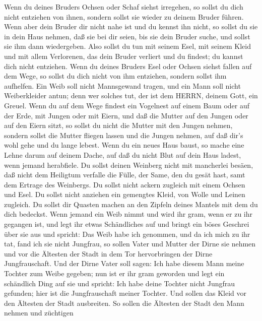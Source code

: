  Wenn du deines Bruders Ochsen oder Schaf siehst irregehen,
so sollst du dich nicht entziehen von ihnen, sondern sollst sie wieder
zu deinem Bruder führen.  Wenn aber dein Bruder dir nicht
nahe ist und du kennst ihn nicht, so sollst du sie in dein Haus nehmen,
daß sie bei dir seien, bis sie dein Bruder suche, und sollst sie ihm
dann wiedergeben.  Also sollst du tun mit seinem Esel, mit
seinem Kleid und mit allem Verlorenen, das dein Bruder verliert und du
findest; du kannst dich nicht entziehen.  Wenn du deines
Bruders Esel oder Ochsen siehst fallen auf dem Wege, so sollst du dich
nicht von ihm entziehen, sondern sollst ihm aufhelfen.  Ein
Weib soll nicht Mannsgewand tragen, und ein Mann soll nicht
Weiberkleider antun; denn wer solches tut, der ist dem HERRN, deinem
Gott, ein Greuel.  Wenn du auf dem Wege findest ein
Vogelnest auf einem Baum oder auf der Erde, mit Jungen oder mit Eiern,
und daß die Mutter auf den Jungen oder auf den Eiern sitzt, so sollst du
nicht die Mutter mit den Jungen nehmen,  sondern sollst die
Mutter fliegen lassen und die Jungen nehmen, auf daß dir's wohl gehe und
du lange lebest.  Wenn du ein neues Haus baust, so mache
eine Lehne darum auf deinem Dache, auf daß du nicht Blut auf dein Haus
ladest, wenn jemand herabfiele.  Du sollst deinen Weinberg
nicht mit mancherlei besäen, daß nicht dem Heiligtum verfalle die Fülle,
der Same, den du gesät hast, samt dem Ertrage des Weinbergs.
 Du sollst nicht ackern zugleich mit einem Ochsen und Esel.
 Du sollst nicht anziehen ein gemengtes Kleid, von Wolle
und Leinen zugleich.  Du sollst dir Quasten machen an den
Zipfeln deines Mantels mit dem du dich bedeckst.  Wenn
jemand ein Weib nimmt und wird ihr gram, wenn er zu ihr gegangen ist,
 und legt ihr etwas Schändliches auf und bringt ein böses
Geschrei über sie aus und spricht: Das Weib habe ich genommen, und da
ich mich zu ihr tat, fand ich sie nicht Jungfrau,  so
sollen Vater und Mutter der Dirne sie nehmen und vor die Ältesten der
Stadt in dem Tor hervorbringen der Dirne Jungfrauschaft. 
Und der Dirne Vater soll sagen: Ich habe diesem Mann meine Tochter zum
Weibe gegeben; nun ist er ihr gram geworden  und legt ein
schändlich Ding auf sie und spricht: Ich habe deine Tochter nicht
Jungfrau gefunden; hier ist die Jungfrauschaft meiner Tochter. Und
sollen das Kleid vor den Ältesten der Stadt ausbreiten.  So
sollen die Ältesten der Stadt den Mann nehmen und züchtigen
